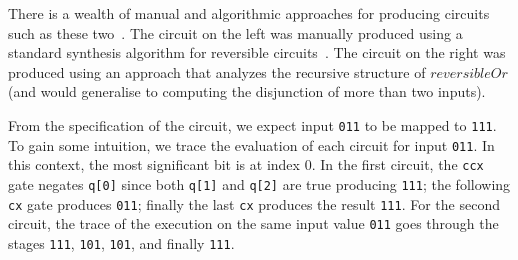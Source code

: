 There is a wealth of manual and algorithmic approaches for producing circuits such as these
two~\cite{maslov:2003:rls:1087512,1201583}. The circuit on the left was manually produced using a standard synthesis
algorithm for reversible circuits~\cite{10.1145/775832.775915}. The circuit on the right was produced using an approach
that analyzes the recursive structure of $\mathit{reversibleOr}$ (and would generalise to computing the disjunction of
more than two inputs).

From the specification of the circuit, we expect input \verb|011| to be mapped
to \verb|111|. To gain some intuition, we trace the evaluation of each circuit for
input \verb|011|. In this context, the most significant bit is at index 0. In
the first circuit, the \verb|ccx| gate negates \verb|q[0]| since both \verb|q[1]| and
\verb|q[2]| are true producing \verb|111|; the following \verb|cx| gate produces
\verb|011|; finally the last \verb|cx| produces the result \verb|111|. For the
second circuit, the trace of the execution on the same input value \verb|011| goes through the stages \verb|111|, \verb|101|, \verb|101|, and finally \verb|111|.

